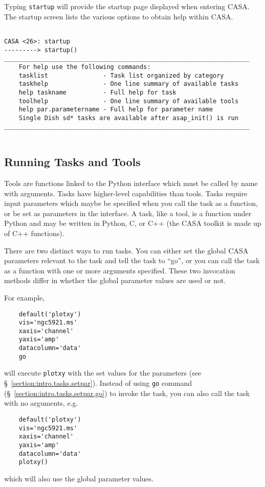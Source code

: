 Typing {\tt startup} will provide the startup page displayed when
entering CASA. The startup screen lists the various options to obtain
help within CASA.
\small
\begin{verbatim}

CASA <26>: startup
---------> startup()
___________________________________________________________________
    For help use the following commands:
    tasklist               - Task list organized by category
    taskhelp               - One line summary of available tasks
    help taskname          - Full help for task
    toolhelp               - One line summary of available tools
    help par.parametername - Full help for parameter name
    Single Dish sd* tasks are available after asap_init() is run   
___________________________________________________________________


\end{verbatim}
\normalsize


\subsection{Running Tasks and Tools}
\label{section:intro.tasks.run}

Tools are functions linked to the Python interface which must be
called by name with arguments.  Tasks have higher-level capabilities
than tools.  Tasks require input parameters which maybe be specified
when you call the task as a function, or be set as parameters in the
interface.  A task, like a tool, is a function under Python and may be
written in Python, C, or C++ (the CASA toolkit is made up of C++
functions).

There are two distinct ways to run tasks. You can either set the
global CASA parameters relevant to the task and
tell the task to ``go'', or you can call the task as a function with
one or more arguments specified.  These two invocation methods differ
in whether the global parameter values are used or not.

For example,
\small
\begin{verbatim}
    default('plotxy')
    vis='ngc5921.ms'
    xaxis='channel'
    yaxis='amp'
    datacolumn='data'
    go
\end{verbatim}
\normalsize
will execute {\tt plotxy} with the set values for the parameters
(see \S~\ref{section:intro.tasks.setpar}).  Instead of using 
{\tt go} command (\S~\ref{section:intro.tasks.setpar.go}) to invoke
the task, you can also call the task with no arguments, e.g.
\small
\begin{verbatim}
    default('plotxy')
    vis='ngc5921.ms'
    xaxis='channel'
    yaxis='amp'
    datacolumn='data'
    plotxy()
\end{verbatim}
\normalsize
which will also use the global parameter values.

